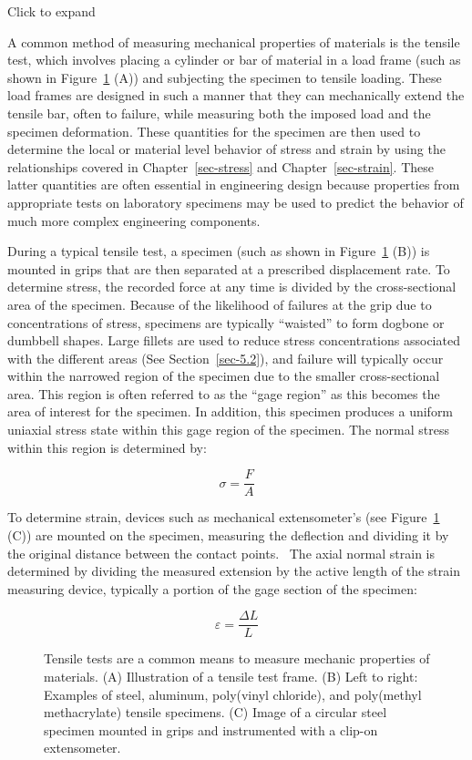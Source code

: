 \documentclass[
  letterpaper,
  DIV=11,
  numbers=noendperiod]{scrreprt}
\theoremstyle{definition}
\theoremstyle{remark}
\begin{document}
Click to expand

A common method of measuring mechanical properties of materials is the
tensile test, which involves placing a cylinder or bar of material in a
load frame (such as shown in Figure~\ref{fig-4.1} (A)) and subjecting
the specimen to tensile loading. These load frames are designed in such
a manner that they can mechanically extend the tensile bar, often to
failure, while measuring both the imposed load and the specimen
deformation. These quantities for the specimen are then used to
determine the local or material level behavior of stress and strain by
using the relationships covered in Chapter~\ref{sec-stress} and
Chapter~\ref{sec-strain}. These latter quantities are often essential in
engineering design because properties from appropriate tests on
laboratory specimens may be used to predict the behavior of much more
complex engineering components.

During a typical tensile test, a specimen (such as shown in
Figure~\ref{fig-4.1} (B)) is mounted in grips that are then separated at
a prescribed displacement rate. To determine stress, the recorded force
at any time is divided by the cross-sectional area of the specimen.
Because of the likelihood of failures at the grip due to concentrations
of stress, specimens are typically ``waisted'' to form dogbone or
dumbbell shapes. Large fillets are used to reduce stress concentrations
associated with the different areas (See Section~\ref{sec-5.2}), and
failure will typically occur within the narrowed region of the specimen
due to the smaller cross-sectional area. This region is often referred
to as the ``gage region'' as this becomes the area of interest for the
specimen. In addition, this specimen produces a uniform uniaxial stress
state within this gage region of the specimen. The normal stress within
this region is determined by:

\[
\sigma=\frac{F}{A}
\]

To determine strain, devices such as mechanical extensometer's (see
Figure~\ref{fig-4.1} (C)) are mounted on the specimen, measuring the
deflection and dividing it by the original distance between the contact
points.~ The axial normal strain is determined by dividing the measured
extension by the active length of the strain measuring device, typically
a portion of the gage section of the specimen:

\[
\varepsilon=\frac{\Delta L}{L}
\]

\begin{figure}


\caption{\label{fig-4.1}Tensile tests are a common means to measure
mechanic properties of materials. (A) Illustration of a tensile test
frame. (B) Left to right: Examples of steel, aluminum, poly(vinyl
chloride), and poly(methyl methacrylate) tensile specimens. (C) Image of
a circular steel specimen mounted in grips and instrumented with a
clip-on extensometer.}

\end{figure}%
\end{document}
